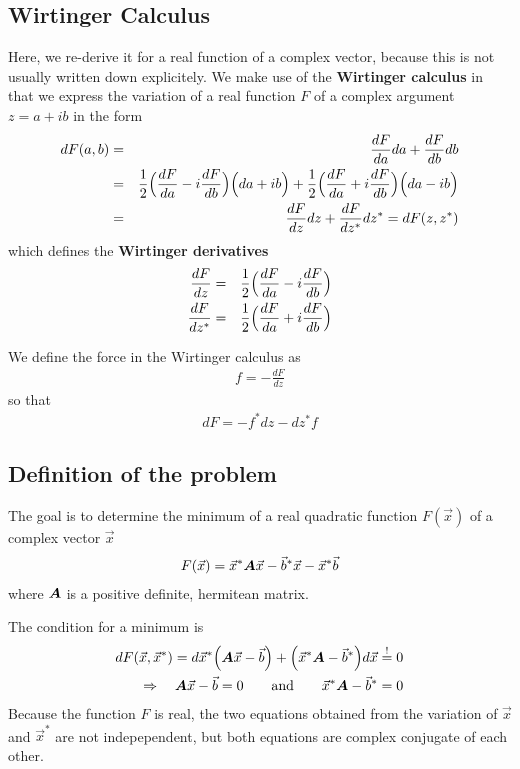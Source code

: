\documentclass[11pt,a4paper]{report}
\begin{document}
\subsection{Wirtinger Calculus}
Here, we re-derive it for a real function of a complex vector, because
this is not usually written down explicitely.  We make use of the
\textbf{Wirtinger calculus} in that we
express the variation of a real function $F$ of a complex argument $z=a+ib$
in the form
\begin{eqnarray}
dF(a,b)&=&\frac{dF}{da}da+\frac{dF}{db}db
\nonumber\\
&=&\frac{1}{2}\Bigl(\frac{dF}{da}-i\frac{dF}{db}\Bigr)\Bigl(da+ib\Bigr)
+\frac{1}{2}\Bigl(\frac{dF}{da}+i\frac{dF}{db}\Bigr)\Bigl(da-ib\Bigr)
\nonumber\\
&=&\frac{dF}{dz}dz+ \frac{dF}{dz^*}dz^*=dF(z,z^*)
\end{eqnarray}
which defines the \textbf{Wirtinger derivatives}
\begin{eqnarray}
\frac{dF}{dz}&=&\frac{1}{2}\Bigl(\frac{dF}{da}-i\frac{dF}{db}\Bigr)
\nonumber\\
\frac{dF}{dz^*}&=&\frac{1}{2}\Bigl(\frac{dF}{da}+i\frac{dF}{db}\Bigr)
\end{eqnarray}


We define the force in the Wirtinger calculus as
\begin{eqnarray}
f=-\frac{dF}{dz}
\end{eqnarray}
so that
\begin{eqnarray}
dF=-f^*dz-dz^*f
\end{eqnarray}


\subsection{Definition of the problem}
The goal is to determine the minimum of a real quadratic function
$F(\vec{x})$ of a complex vector $\vec{x}$
\begin{eqnarray}
F(\vec{x})=\vec{x}^*\bm{A}\vec{x}-\vec{b}^*\vec{x}-\vec{x}^*\vec{b}
\end{eqnarray}
where $\bm{A}$ is a positive definite, hermitean matrix.

The condition for a minimum is
\begin{eqnarray}
dF(\vec{x},\vec{x}^*)
=d\vec{x}^*\Bigl(\bm{A}\vec{x}-\vec{b}\Bigr)
+\Bigl(\vec{x}^*\bm{A}-\vec{b}^*\Bigr)d\vec{x}\stackrel{!}{=}0
\nonumber\\
\Rightarrow\quad
\bm{A}\vec{x}-\vec{b}=0\qquad\text{and}\qquad \vec{x}^*\bm{A}-\vec{b}^*=0
\end{eqnarray}
Because the function $F$ is real, the two equations obtained from the
variation of $\vec{x}$ and $\vec{x}^*$ are not indepependent, but both
equations are complex conjugate of each other.
\end{document}
